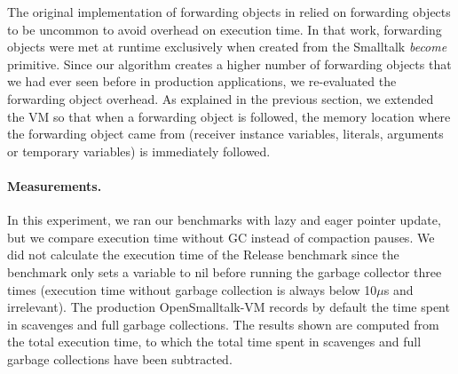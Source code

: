 \documentclass[sigplan,10pt,review,anonymous]{acmart}\settopmatter{printfolios=true,printccs=false,printacmref=false}
\newcommand{\egb}[1]{\color{blue}\fbox{\bfseries\sffamily\scriptsize Elisa:}{\sf\small$\blacktriangleright$\textit{#1}$\blacktriangleleft$}\color{black}}
\newcommand{\eem}[1]{\color{olive}\fbox{\bfseries\sffamily\scriptsize Eliot:}{\sf\small$\blacktriangleright$\textit{#1}$\blacktriangleleft$}\color{black}}
\def\OpenSmalltalkVM{OpenSmalltalk-VM\xspace}
\begin{document}
The original implementation of forwarding objects in \cite{Forwarders} relied on forwarding objects to be uncommon to avoid overhead on execution time. In that work, forwarding objects were met at runtime exclusively when created from the Smalltalk \emph{become} primitive. 
Since our algorithm creates a higher number of forwarding objects that we had ever seen before in production applications,
we re-evaluated the forwarding object overhead. 
As explained in the previous section, we extended the VM so that when a forwarding object is followed, the memory location where the forwarding object came from (receiver instance variables, literals, arguments or temporary variables) is immediately followed. 

\paragraph{Measurements.}
In this experiment, we ran our benchmarks with lazy and eager pointer update, but we compare execution time without GC instead of compaction pauses. We did not calculate the execution time of the Release benchmark since the benchmark only sets a variable to nil before running the garbage collector three times (execution time without garbage collection is always below 10$\mu$s and irrelevant). The production \OpenSmalltalkVM records by default the time spent in scavenges and full garbage collections. The results shown are computed from the total execution time, to which the total time spent in scavenges and full garbage collections have been subtracted.
\end{document}
